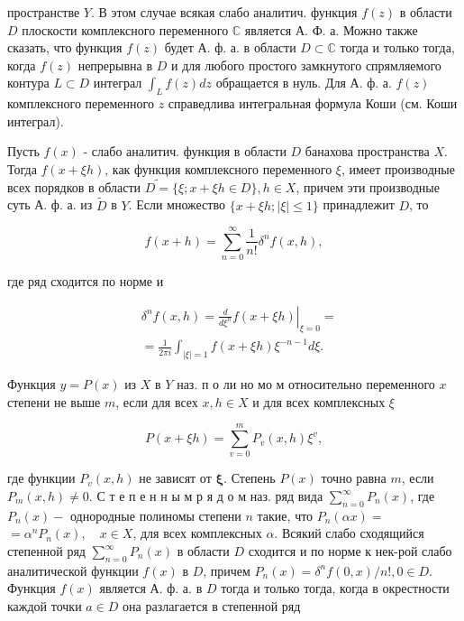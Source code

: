 \documentclass[10pt]{article}
\begin{document}
пространстве $Y$. В этом случае всякая слабо аналитич. функция $f(z)$ в области $D$ плоскости комплексного переменного $\mathbb{C}$ является А. Ф. а. Можно также сказать, что функция $f(z)$ будет А. ф. а. в области $D \subset \mathbb{C}$ тогда и только тогда, когда $f(z)$ непрерывна в $D$ и для любого простого замкнутого спрямляемого контура $L \subset D$ интеграл $\int_{L} f(z) d z$ обращается в нуль. Для А. ф. а. $f(z)$ комплексного переменного $z$ справедлива интегральная формула Коши (см. Коши интеграл).



Пусть $f(x)$ - слабо аналитич. функция в области $D$ банахова пространства $X$. Тогда $f(x+\xi h)$, как функция комплексного переменного $\xi$, имеет производные всех порядков в области $\tilde{D=}\{\xi ; x+\xi h \in D\}, h \in X$, причем эти производные суть А. ф. а. из $\tilde{D}$ в $Y$. Если множество $\{x+\xi h ;|\xi| \leqslant 1\}$ принадлежит $D$, то



\[

f(x+h)=\sum_{n=0}^{\infty} \frac{1}{n !} \delta^{n} f(x, h),

\]



где ряд сходится по норме и



\[

\begin{aligned}

& \delta^{n} f(x, h)=\left.\frac{d}{d \xi^{n}} f(x+\xi h)\right|_{\xi=0}= \\

& =\frac{1}{2 \pi i} \int_{|\xi|=1} f(x+\xi h) \xi^{-n-1} d \xi .

\end{aligned}

\]



Функция $y=P(x)$ из $X$ в $Y$ наз. п о ли но мо м относительно переменного $x$ степени не выше $m$, если для всех $x, h \in X$ и для всех комплексных $\xi$



\[

P(x+\xi h)=\sum_{v=0}^{m} P_{v}(x, h) \xi^{v},

\]



где функции $P_{v}(x, h)$ не зависят от $\boldsymbol{\xi}$. Степень $P(x)$ точно равна $m$, если $P_{m}(x, h) \neq 0$. С т е п е н н ы м р я д о м наз. ряд вида $\sum_{n=0}^{\infty} P_{n}(x)$, где $P_{n}(x)-$ однородные полиномы степени $n$ такие, что $P_{n}(\alpha x)=$ $=\alpha^{n} P_{n}(x), \quad x \in X$, для всех комплексных $\alpha$. Всякий слабо сходящийся степенной ряд $\sum_{n=0}^{\infty} P_{n}(x)$ в области $D$ сходится и по норме к нек-рой слабо аналитической функции $f(x)$ в $D$, причем $P_{n}(x)=\delta^{n} f(0, x) / n !, 0 \in D$. Функция $f(x)$ является А. ф. а. в $D$ тогда и только тогда, когда в окрестности каждой точки $a \in D$ она разлагается в степенной ряд
\end{document}
